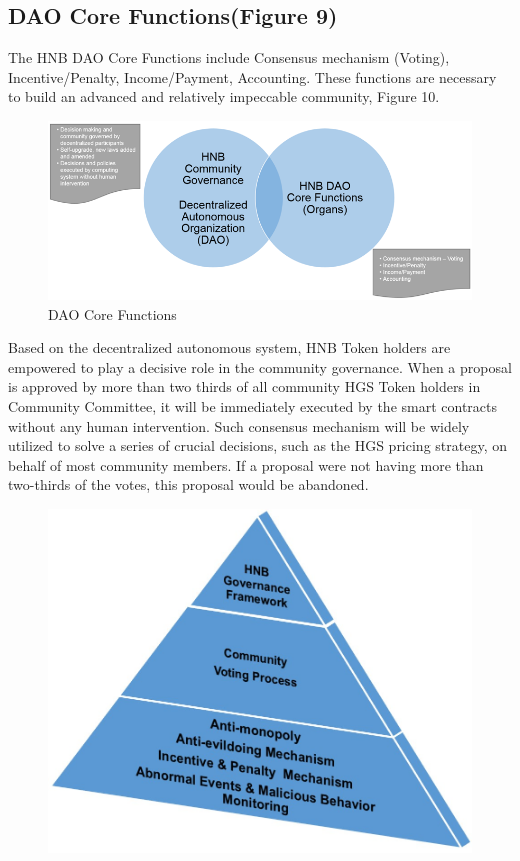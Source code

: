 \documentclass[fleqn,10pt]{SelfArx} %
\begin{document}
\subsection{DAO Core Functions(Figure 9)}
The HNB DAO Core Functions include Consensus mechanism (Voting), Incentive/Penalty, Income/Payment, Accounting. These functions are necessary to build an advanced and relatively impeccable community, Figure 10.\\

\begin{figure}[ht]\centering
\includegraphics[width=\linewidth]{9}
\caption{DAO Core Functions}
\label{fig:9}
\end{figure}

Based on the decentralized autonomous system, HNB Token holders are empowered to play a decisive role in the community governance. When a proposal is approved by more than two thirds of all community HGS Token holders in Community Committee, it will be immediately executed by the smart contracts without any human intervention. Such consensus mechanism will be widely utilized to solve a series of crucial decisions, such as the HGS pricing strategy, on behalf of most community members. If a proposal were not having more than two-thirds of the votes, this proposal would be abandoned. \\

\begin{figure}[ht]\centering
\includegraphics[width=\linewidth]{10}
\caption{}
\label{fig:10}
\end{figure}
\end{document}

